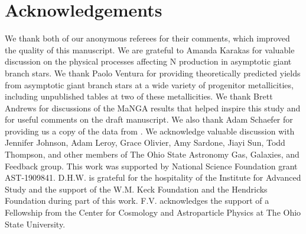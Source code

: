 \documentclass[ms.tex]{subfiles}
\begin{document}
\section{Acknowledgements}
\label{sec:acknowledgements}

{\color{red}
We thank both of our anonymous referees for their comments, which improved the
quality of this manuscript.
}
We are grateful to Amanda Karakas for valuable discussion on the physical
processes affecting N production in asymptotic giant branch stars.
We thank Paolo Ventura for providing theoretically predicted yields from
asymptotic giant branch stars at a wide variety of progenitor metallicities,
including unpublished tables at two of these metallicities.
We thank Brett Andrews for discussions of the MaNGA results that helped inspire
this study and for useful comments on the draft manuscript.
We also thank Adam Schaefer for providing us a copy of the data from
\citet{Schaefer2020}.
We acknowledge valuable discussion with Jennifer Johnson, Adam Leroy, Grace
Olivier, Amy Sardone, Jiayi Sun, Todd Thompson, and other members of The Ohio
State Astronomy Gas, Galaxies, and Feedback group.
This work was supported by National Science Foundation grant AST-1909841.
D.H.W. is grateful for the hospitality of the Institute for Advanced Study and
the support of the W.M. Keck Foundation and the Hendricks Foundation during
part of this work.
F.V. acknowledges the support of a Fellowship from the Center for Cosmology and
Astroparticle Physics at The Ohio State University.
\end{document}
